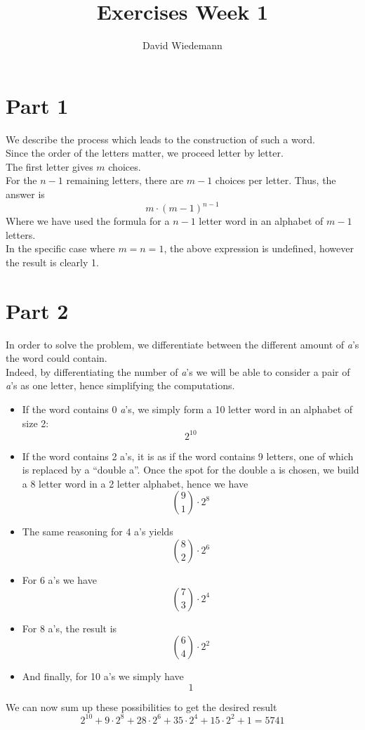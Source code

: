 \documentclass[11pt, a4paper, twoside]{article}
\date{}
\begin{document}
\title{Exercises Week 1}
\author{David Wiedemann}
\maketitle
\section*{Part 1}

We describe the process which leads to the construction of such a word.\\
Since the order of the letters matter, we proceed letter by letter.\\
The first letter gives $m$ choices.\\
For the $n-1$ remaining letters, there are $m-1$ choices per letter.
Thus, the answer is 
\[ 
	m \cdot ( m-1)^{n-1}
\]
Where we have used the formula for a $n-1$ letter word in an alphabet of $m-1$ letters.\\
In the specific case where $m=n=1$, the above expression is undefined, however the result is clearly 1.
\section*{Part 2}
In order to solve the problem, we differentiate between the different amount of \textit{a}'s the word could contain.\\
Indeed, by differentiating the number of \textit{a}'s we will be able to consider a pair of \textit{a}'s as one letter, hence simplifying the computations.\\
\begin{itemize}
	\item If the word contains 0 \textit{a}'s, we simply form a 10 letter word in an alphabet of  size 2:
		\[ 
		2^{10}
		\]
		
	\item If the word contains 2 a's, it is as if the word contains 9 letters, one of which is replaced by a ``double a''. Once the spot for the double a is chosen, we build a 8 letter word in a 2 letter alphabet, hence we have
\[ 
\binom 9 1 \cdot 2^{8}
\]
\item The same reasoning for 4 a's yields
	\[ 
	\binom 8 2 \cdot 2^{6}
	\]

\item For 6 a's we have
	\[ 
	\binom 7 3 \cdot 2^{4}
	\]

\item For 8 a's, the result is
	\[ 
	\binom 6 4 \cdot 2^{2}
	\]

\item And finally, for 10 a's we simply have
	\[ 
	1
	\]
\end{itemize}
We can now sum up these possibilities to get the desired result
\[ 
2^{10} + 9 \cdot 2^{8} + 28 \cdot 2^{6} + 35 \cdot 2^{4} + 15 \cdot 2^{2} + 1 = 5741
\]
\end{document}
